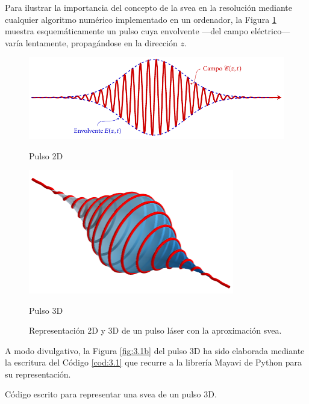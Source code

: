 Para ilustrar la importancia del concepto de la \acrshort{svea} en la resolución mediante cualquier algoritmo numérico implementado en un ordenador, la Figura \ref{fig:3.1} muestra esquemáticamente un pulso cuya envolvente ---del campo eléctrico--- varía lentamente, propagándose en la dirección $z$.
\begin{figure}[ht!]
  \centering
  \begin{subcaptionblock}{.4\textwidth}
    \centering
    \includegraphics[width=1.2\textwidth]{Figuras/ch3_pulso2d.pdf}
    \caption{Pulso 2D}\label{fig:3.1a}
  \end{subcaptionblock}%
  \begin{subcaptionblock}{.4\textwidth}
    \centering
    \includegraphics[width=0.8\textwidth]{Figuras/ch3_pulso3d.png}
    \caption{Pulso 3D}\label{fig:3.1b}
  \end{subcaptionblock}%
  \caption{Representación 2D y 3D de un pulso láser con la aproximación \acrshort{svea}.}
  \label{fig:3.1}
\end{figure}

A modo divulgativo, la Figura \ref{fig:3.1b} del pulso 3D ha sido elaborada mediante la escritura del Código \ref{cod:3.1} que recurre a la librería Mayavi de Python para su representación.
\begin{listing}[htbp!]
  \caption{Código escrito para representar una \acrshort{svea} de un pulso 3D.}
  \inputminted[firstline=8, lastline=39]{python}{Programas/mlaser.py}
  \label{cod:3.1}
\end{listing}

